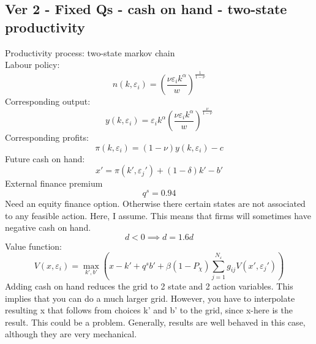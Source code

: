 \documentclass[12pt]{article}
\begin{document}
\subsection{Ver 2 - Fixed Qs - cash on hand - two-state productivity}
Productivity process: two-state markov chain \vspace{3mm} \\
Labour policy: 
\begin{equation}
    n(k,\varepsilon_i) = \left( \dfrac{ \nu \varepsilon_i k^\alpha}{w} \right)^{\frac{1}{1-\nu}}
\end{equation}
Corresponding output: 
\begin{equation}
    y(k,\varepsilon_i) = \varepsilon_i k^{\alpha} \left( \dfrac{\nu \varepsilon_i k^\alpha}{w} \right)^{\frac{\nu}{1-\nu}}
\end{equation}
Corresponding profits: 
\begin{equation}
    \pi(k,\varepsilon_i) = (1-\nu) y(k,\varepsilon_i) - c
\end{equation}
Future cash on hand: 
\begin{equation}
   x' = \pi(k',\varepsilon_j')+(1-\delta)k'-b'
\end{equation}
External finance premium 
\begin{equation}
    q^s = 0.94
\end{equation}
Need an equity finance option. Otherwise there certain states are not associated to any feasible action. Here, I assume. This means that firms will sometimes have negative cash on hand. 
\begin{equation}
    d < 0 \implies d = 1.6d
\end{equation}
Value function:
\begin{equation}
     V(x,\varepsilon_i) = \max_{k',b'}  \left(x - k' +  q^s b' + 
            \beta  (1-P_\chi)  \sum_{j=1}^{N_\varepsilon} g_{ij} V(x',\varepsilon_j') \right)
\end{equation}
Adding cash on hand reduces the grid to 2 state and 2 action variables. This implies that you can do a much larger grid. However, you have to interpolate resulting x that follows from choices k' and b' to the grid, since x-here is the result. This could be a problem. Generally, results are well behaved in this case, although they are very mechanical. 
\end{document}
